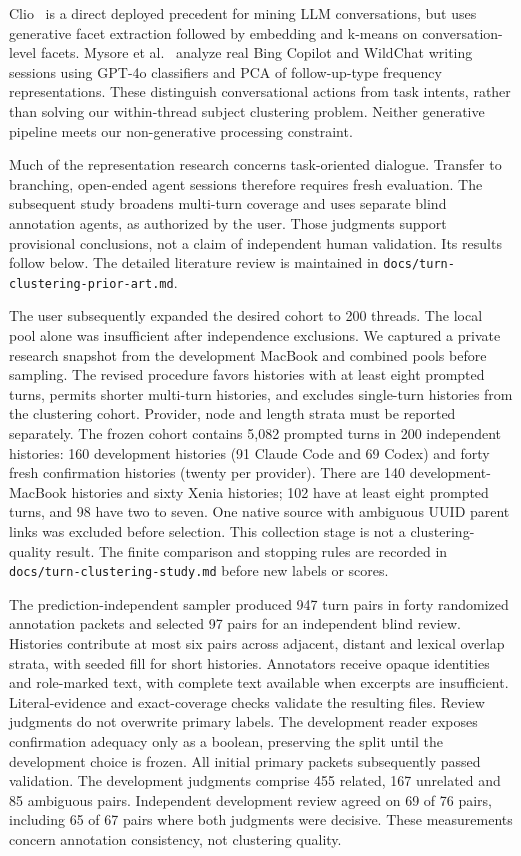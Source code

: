 \documentclass[11pt]{article}
\begin{document}
Clio~\cite{clio} is a direct deployed precedent for mining LLM conversations,
but uses generative facet extraction followed by embedding and k-means on
conversation-level facets. Mysore et al.~\cite{paths} analyze real Bing Copilot
and WildChat writing sessions using GPT-4o classifiers and PCA of follow-up-type
frequency representations. These distinguish conversational actions from task
intents, rather than solving our within-thread subject clustering problem.
Neither generative pipeline meets our non-generative processing constraint.

Much of the representation research concerns task-oriented dialogue. Transfer to branching,
open-ended agent sessions therefore requires fresh evaluation. The subsequent
study broadens multi-turn coverage and uses separate blind annotation agents,
as authorized by the user. Those judgments support provisional conclusions,
not a claim of independent human validation. Its results follow below. The
detailed literature review is maintained in
\texttt{docs/turn-clustering-prior-art.md}.

The user subsequently expanded the desired cohort to 200 threads. The local
pool alone was insufficient after independence exclusions. We captured a private
research snapshot from the development MacBook and combined pools before
sampling. The revised procedure favors histories with at least eight
prompted turns, permits shorter multi-turn histories, and excludes single-turn
histories from the clustering cohort. Provider, node and length strata must be
reported separately. The frozen cohort contains 5,082 prompted turns in 200
independent histories: 160 development histories (91 Claude Code and 69 Codex)
and forty fresh confirmation histories (twenty per provider). There are 140
development-MacBook histories and sixty Xenia histories; 102 have at least eight
prompted turns, and 98 have two to seven. One native source with ambiguous UUID
parent links was excluded before selection. This collection stage is not a
clustering-quality result. The finite comparison and stopping rules are recorded
in \texttt{docs/turn-clustering-study.md} before new labels or scores.

The prediction-independent sampler produced 947 turn pairs in forty randomized
annotation packets and selected 97 pairs for an independent blind review.
Histories contribute at most six pairs across adjacent, distant and lexical
overlap strata, with seeded fill for short histories. Annotators receive opaque
identities and role-marked text, with complete text available when excerpts are
insufficient. Literal-evidence and exact-coverage checks validate the resulting
files. Review judgments do not overwrite primary labels. The development
reader exposes confirmation adequacy only as a boolean, preserving the split
until the development choice is frozen. All initial primary packets subsequently
passed validation. The development judgments comprise 455 related, 167 unrelated
and 85 ambiguous pairs. Independent development review agreed on 69 of 76 pairs,
including 65 of 67 pairs where both judgments were decisive. These measurements
concern annotation consistency, not clustering quality.
\end{document}
